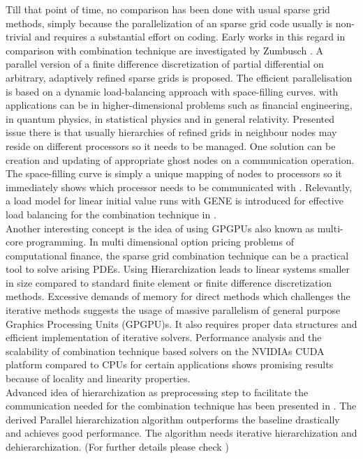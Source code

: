 Till that point of time, no comparison has been done with usual sparse grid methods, simply because the parallelization of an sparse grid code usually is non-trivial and requires a substantial effort on coding. Early works in this regard in comparison with combination technique are investigated by Zumbusch \cite{Zumbusch2000}.
A parallel version of a finite difference discretization of partial differential on arbitrary, adaptively refined sparse grids is proposed. The efficient parallelisation is based on a dynamic load-balancing approach with space-filling curves. with applications can be in higher-dimensional problems such as financial engineering, in quantum physics, in statistical physics and in general relativity. Presented issue there is that usually hierarchies of refined grids in neighbour nodes may reside on different processors so it needs to be managed. One solution can be creation and updating of appropriate ghost nodes on a communication operation. The space-filling curve is simply a unique mapping of nodes to processors so it immediately shows which processor needs to be communicated with \cite{Zumbusch2000}. Relevantly, a load model for linear initial value runs with GENE is introduced for effective load balancing for the combination technique in \cite{Heene2014}. \\

Another interesting concept is the idea of using GPGPUs also known as multi-core programming. In multi dimensional option pricing problems of computational finance, the sparse grid combination technique can be a practical tool to solve arising PDEs. Using Hierarchization leads to linear systems smaller in size compared to standard finite element or finite difference discretization methods. Excessive demands of memory for direct methods which challenges the iterative methods suggests the usage of massive parallelism of general purpose Graphics Processing Units (GPGPU)s. It also requires proper data structures and efficient implementation of iterative solvers. Performance analysis and the scalability of combination technique based solvers on the NVIDIAs CUDA platform compared to CPUs for certain applications shows promising results because of locality and linearity properties.\cite{Gaikwad2009}\\

Advanced idea of hierarchization as preprocessing step to facilitate the communication needed for the combination technique has been presented in \cite{Hupp2013}. The derived Parallel hierarchization algorithm outperforms the baseline drastically and achieves good performance. The algorithm needs iterative hierarchization and dehierarchization. (For further details please check \cite{Hupp2013}) \\

